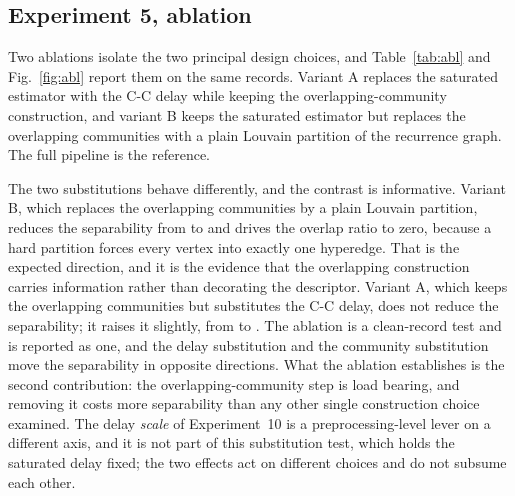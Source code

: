 \documentclass[10pt,a4paper,twocolumn]{article}
\begin{document}
\begin{center}
\small
\begin{minipage}{0.62\textwidth}
\vspace{2pt}

\end{minipage}
\end{center}

\subsection{Experiment 5, ablation}
\label{sec:exp5}

Two ablations isolate the two principal design choices, and
Table~\ref{tab:abl} and Fig.~\ref{fig:abl} report them on the same records.
Variant A replaces the saturated estimator with the C-C delay while keeping
the overlapping-community construction, and variant B keeps the saturated
estimator but replaces the overlapping communities with a plain Louvain
partition of the recurrence graph.  The full pipeline is the reference.

The two substitutions behave differently, and the contrast is informative.
Variant B, which replaces the overlapping communities by a plain Louvain
partition, reduces the separability from \ablFull{} to \ablB{} and drives the
overlap ratio to zero, because a hard partition forces every vertex into
exactly one hyperedge.  That is the expected direction, and it is the evidence
that the overlapping construction carries information rather than decorating
the descriptor.  Variant A, which keeps the overlapping communities but
substitutes the C-C delay, does not reduce the separability; it raises it
slightly, from \ablFull{} to \ablA{}.  The ablation is a clean-record test and
is reported as one, and the delay substitution and the community substitution
move the separability in opposite directions.  What the ablation establishes is
the second contribution: the overlapping-community step is load bearing, and
removing it costs more separability than any other single construction choice
examined.  The delay \emph{scale} of Experiment~10 is a preprocessing-level
lever on a different axis, and it is not part of this substitution test, which
holds the saturated delay fixed; the two effects act on different choices and
do not subsume each other.

\begin{table}[t]
\centering
\caption{Ablation.  Variant A substitutes the C-C delay estimator, variant B
substitutes a non-overlapping Louvain partition.}
\label{tab:abl}
\scriptsize

\end{table}
\end{document}
